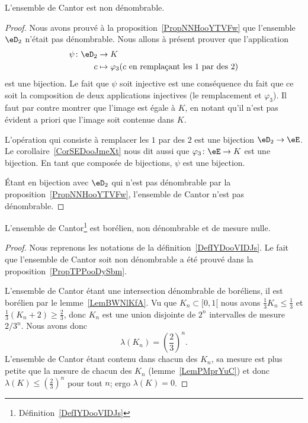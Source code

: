 \begin{proposition}    \label{PropTPPooDySbm}
    L'ensemble de Cantor est non dénombrable.
\end{proposition}

\begin{proof}

    Nous avons prouvé à la proposition~\ref{PropNNHooYTVFw} que l'ensemble \( \eD_2\) n'était pas dénombrable. Nous allons à présent prouver que l'application
    \begin{equation}
        \begin{aligned}
            \psi\colon \eD_2&\to K \\
            c&\mapsto \varphi_3(   c\text{ en remplaçant les } 1\text{ par des } 2  )
        \end{aligned}
    \end{equation}
    est une bijection. Le fait que \( \psi\) soit injective est une conséquence du fait que ce soit la composition de deux applications injectives (le remplacement et \( \varphi_3\)). Il faut par contre montrer que l'image est égale à \( K\), en notant qu'il n'est pas évident a priori que l'image soit contenue dans \( K\).

    L'opération qui consiste à remplacer les \( 1\) par des \( 2\) est une bijection \( \eD_2\to \eE\). Le corollaire~\ref{CorSEDooJmeXt} nous dit aussi que \( \varphi_3\colon \eE\to K\) est une bijection. En tant que composée de bijections, \( \psi\) est une bijection.

    Étant en bijection avec \( \eD_2\) qui n'est pas dénombrable par la proposition~\ref{PropNNHooYTVFw}, l'ensemble de Cantor n'est pas dénombrable.
\end{proof}

\begin{proposition}    \label{PropBEWooXZdKN}
    L'ensemble de Cantor\footnote{Définition~\ref{DefIYDooVIDJs}} est borélien, non dénombrable et de mesure nulle.
\end{proposition}

\begin{proof}
    Nous reprenons les notations de la définition~\ref{DefIYDooVIDJs}. Le fait que l'ensemble de Cantor soit non dénombrable a été prouvé dans la proposition~\ref{PropTPPooDySbm}.

    L'ensemble de Cantor étant une intersection dénombrable de boréliens, il est borélien par le lemme~\ref{LemBWNlKfA}. Vu que \( K_n\subset\mathopen[ 0 , 1 [\) nous avons \( \frac{1}{ 3 }K_n\leq \frac{1}{ 3 }\) et \( \frac{1}{ 3 }(K_n+2)\geq \frac{ 2 }{ 3 }\), donc \( K_n\) est une union disjointe de \( 2^n\) intervalles de mesure \( 2/3^n\). Nous avons donc
        \begin{equation}
            \lambda(K_n)=\left( \frac{ 2 }{ 3 } \right)^n.
        \end{equation}
        L'ensemble de Cantor étant contenu dans chacun des \( K_n\), sa mesure est plus petite que la mesure de chacun des \( K_n\) (lemme~\ref{LemPMprYuC}) et donc \( \lambda(K)\leq \left( \frac{ 2 }{ 3 } \right)^n\) pour tout \( n\); ergo \( \lambda(K)=0\).
\end{proof}


